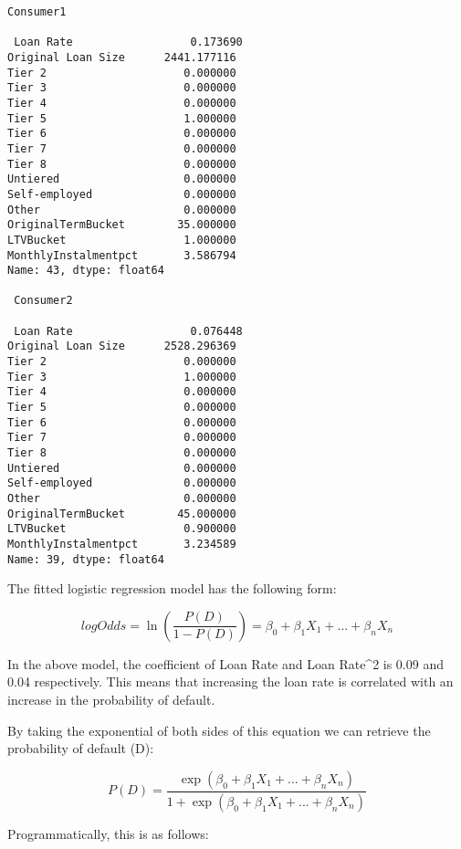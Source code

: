 \documentclass[11pt]{article}
\begin{document}
    \begin{Verbatim}[commandchars=\\\{\}]
Consumer1

 Loan Rate                  0.173690
Original Loan Size      2441.177116
Tier 2                     0.000000
Tier 3                     0.000000
Tier 4                     0.000000
Tier 5                     1.000000
Tier 6                     0.000000
Tier 7                     0.000000
Tier 8                     0.000000
Untiered                   0.000000
Self-employed              0.000000
Other                      0.000000
OriginalTermBucket        35.000000
LTVBucket                  1.000000
MonthlyInstalmentpct       3.586794
Name: 43, dtype: float64 

 Consumer2

 Loan Rate                  0.076448
Original Loan Size      2528.296369
Tier 2                     0.000000
Tier 3                     1.000000
Tier 4                     0.000000
Tier 5                     0.000000
Tier 6                     0.000000
Tier 7                     0.000000
Tier 8                     0.000000
Untiered                   0.000000
Self-employed              0.000000
Other                      0.000000
OriginalTermBucket        45.000000
LTVBucket                  0.900000
MonthlyInstalmentpct       3.234589
Name: 39, dtype: float64

    \end{Verbatim}

    The fitted logistic regression model has the following form:

\[logOdds = \ln (\frac{P(D)}{1-P(D)}) = \beta_0 + \beta_1 X_1 + ... + \beta_n X_n\]

In the above model, the coefficient of Loan Rate and Loan Rate\^{}2 is
0.09 and 0.04 respectively. This means that increasing the loan rate is
correlated with an increase in the probability of default.

By taking the exponential of both sides of this equation we can retrieve
the probability of default (D):

\[P(D) = \frac{\exp(\beta_0 + \beta_1 X_1 + ... + \beta_n X_n)}{1+\exp(\beta_0 + \beta_1 X_1 + ... + \beta_n X_n)}\]

Programmatically, this is as follows:
\end{document}
